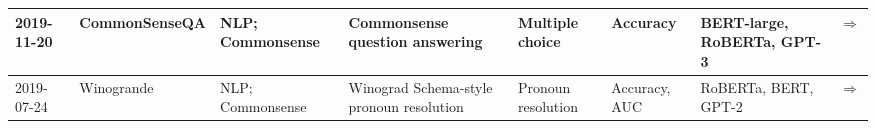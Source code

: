 \documentclass{article}
\begin{document}
\begin{landscape}
{\begin{longtable}{|p{1.5cm}|p{2.5cm}|p{2cm}|p{2cm}|p{3cm}|p{2cm}|p{2cm}|p{1cm}|}
2019-11-20 & CommonSenseQA & NLP; Commonsense & Commonsense question answering & Multiple choice & Accuracy & BERT-large, RoBERTa, GPT-3 & \cite{talmor2019commonsenseqaquestionansweringchallenge} \href{https://arxiv.org/abs/1811.00937}{$\Rightarrow$ } \\ \hline
2019-07-24 & Winogrande & NLP; Commonsense & Winograd Schema-style pronoun resolution & Pronoun resolution & Accuracy, AUC & RoBERTa, BERT, GPT-2 & \cite{sakaguchi2019winograndeadversarialwinogradschema} \href{https://arxiv.org/abs/1907.10641}{$\Rightarrow$ } \\ \hline
\end{longtable}
}
\end{landscape}
\printbibliography
\end{document}
